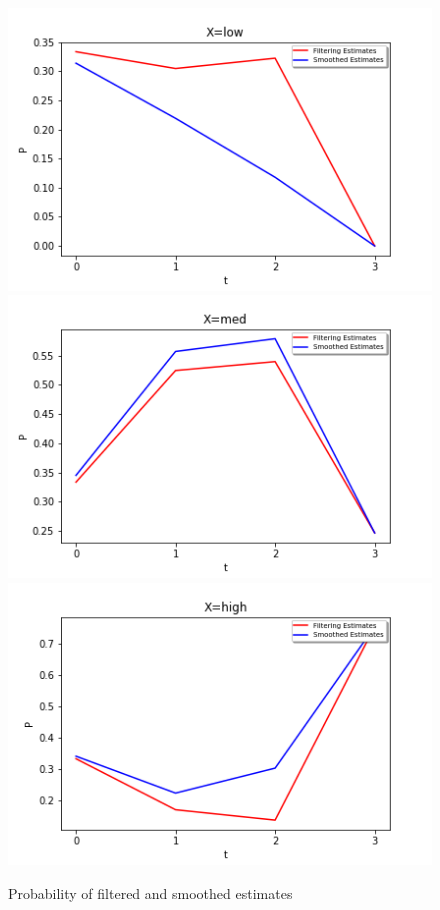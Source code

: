 \documentclass[letter, 10pt]{article}
\begin{document}
\begin{figure}[H]
        \centering
        \includegraphics[width=\textwidth]{HW3/low.png}
    \endminipage\hfill
        \centering
        \includegraphics[width=\textwidth]{HW3/med.png}
    \endminipage\hfill
        \centering
        \includegraphics[width=\textwidth]{HW3/high.png}
    \endminipage\hfill
    \caption{Probability of filtered and smoothed estimates}
\end{figure}
\end{document}

